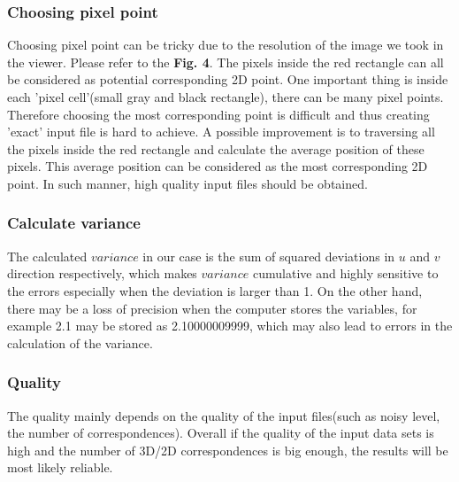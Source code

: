 \documentclass[a4paper]{article}
\begin{document}
\subsubsection{\small Choosing pixel point}
Choosing pixel point can be tricky due to the resolution of the image we took in the viewer. Please refer to the \textbf{Fig. 4}. The pixels inside the red rectangle can all be considered as potential corresponding 2D point. One important thing is inside each 'pixel cell'(small gray and black rectangle), there can be many pixel points. Therefore choosing the most corresponding point is difficult and thus creating 'exact' input file is hard to achieve. A possible improvement is to traversing all the pixels inside the red rectangle and calculate the average position of these pixels. This average position can be considered as the most corresponding 2D point. In such manner, high quality input files should be obtained.

\subsubsection{\small Calculate variance}
The calculated $variance$ in our case is the sum of squared deviations in $u$ and $v$ direction respectively, which makes $variance$ cumulative and highly sensitive to the errors especially when the deviation is larger than 1. On the other hand, there may be a loss of precision when the computer stores the variables, for example 2.1 may be stored as 2.10000009999, which may also lead to errors in the calculation of the variance. 

\subsubsection{\small Quality}

The quality mainly depends on the quality of the input files(such as noisy level, the number of correspondences). Overall if the quality of the input data sets is high and the number of 3D/2D correspondences is big enough, the results will be most likely reliable.
\end{document}
